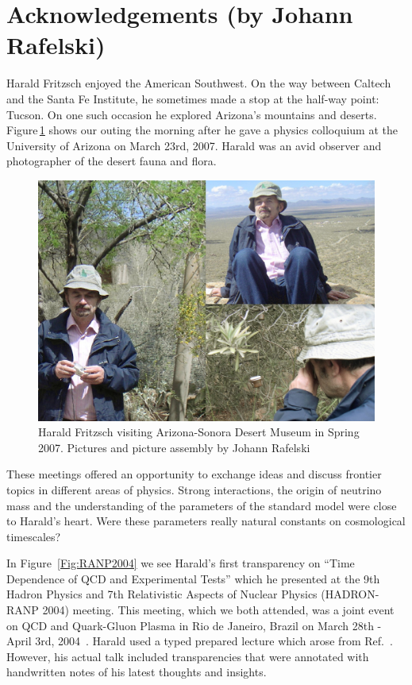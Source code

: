\documentclass{ws-ijmpa}
\begin{document}
\section*{Acknowledgements (by Johann Rafelski)}
\label{sec:acknowledgements}
Harald Fritzsch enjoyed the American Southwest. On the way between Caltech and the Santa Fe Institute, he sometimes made a stop at the half-way point: Tucson. On one such occasion he explored Arizona's mountains and deserts. Figure\,\ref{Fig:AZcolloq2007} shows our outing the morning after he gave a physics colloquium at the University of Arizona on March 23rd, 2007. Harald was an avid observer and photographer of the desert fauna and flora. 

\begin{figure}%
\centerline{\includegraphics[width=0.99\columnwidth]{07March24HaraldCollageDesertMuseum.jpg}}
\caption{Harald Fritzsch visiting Arizona-Sonora Desert Museum in Spring 2007. Pictures and picture assembly by Johann Rafelski
}
\label{Fig:AZcolloq2007} 
\end{figure}

These meetings offered an opportunity to exchange ideas and discuss frontier topics in different areas of physics. Strong interactions, the origin of neutrino mass and the understanding of the parameters of the standard model were close to Harald's heart. Were these parameters really natural constants on cosmological timescales? 

In Figure~\ref{Fig:RANP2004} we see Harald's first transparency on ``Time Dependence of QCD and Experimental Tests'' which he presented at the 9th Hadron Physics and 7th Relativistic Aspects of Nuclear Physics (HADRON-RANP 2004) meeting. This meeting, which we both attended, was a joint event on QCD and Quark-Gluon Plasma in Rio de Janeiro, Brazil on March 28th - April 3rd, 2004~\cite{Fritzsch:2004civ}. Harald used a typed prepared lecture which arose from Ref.~. However, his actual talk included transparencies that were annotated with handwritten notes of his latest thoughts and insights.
\end{document}
